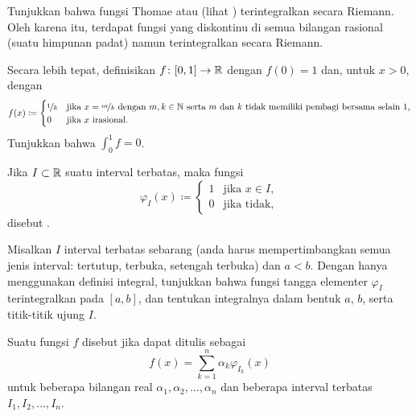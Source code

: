 \begin{exercise}[Menantang]
Tunjukkan bahwa fungsi
Thomae atau 
(lihat )
terintegralkan secara Riemann.  Oleh karena itu, terdapat
fungsi yang diskontinu di semua bilangan rasional (suatu himpunan padat)
namun terintegralkan secara Riemann.

Secara lebih tepat,
definisikan $f \colon [0,1] \to {\mathbb{R}}$ dengan $f(0)=1$ dan, untuk $x > 0$, dengan
\begin{equation*}
f(x) \coloneqq 
\begin{cases}
\nicefrac{1}{k} & \text{jika } x=\nicefrac{m}{k} \text{ dengan }
m,k \in {\mathbb{N}} \text{ serta } m \text{ dan } k \text{ tidak memiliki pembagi bersama selain 1,} \\
0               & \text{jika } x \text{ irasional.}
\end{cases}
\end{equation*}
Tunjukkan bahwa $\int_0^1 f = 0$.
\end{exercise}


\begin{exnote}
Jika $I \subset {\mathbb{R}}$ suatu interval terbatas, maka
fungsi
\begin{equation*}
\varphi_I(x) \coloneqq
\begin{cases}
1 & \text{jika } x \in I, \\
0 & \text{jika tidak,}
\end{cases}
\end{equation*}
disebut \emph{}.
\end{exnote}

\begin{exercise} \label{exercise:stepfunctionintegrable}
Misalkan $I$ interval terbatas sebarang (anda harus mempertimbangkan semua jenis
interval: tertutup, terbuka, setengah terbuka) dan $a < b$.  Dengan
hanya menggunakan definisi integral,
tunjukkan bahwa
fungsi tangga elementer $\varphi_I$ terintegralkan
pada $[a,b]$, dan tentukan integralnya dalam bentuk $a$, $b$, serta
titik-titik ujung $I$.
\end{exercise}

\begin{exnote}
Suatu fungsi $f$ disebut
\emph{} jika
dapat ditulis sebagai
\begin{equation*}
f(x) = \sum_{k=1}^n \alpha_k \varphi_{I_k} (x)
\end{equation*}
untuk beberapa bilangan real $\alpha_1,\alpha_2, \ldots, \alpha_n$
dan beberapa interval terbatas $I_1,I_2,\ldots,I_n$.
\end{exnote}

